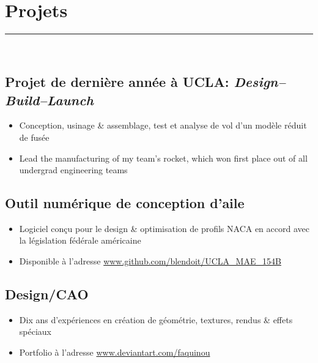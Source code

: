 \documentclass[10pt]{report}
\begin{document}
\section*{Projets}
\rule{\linewidth}{1pt}\\
\subsection*{Projet de dernière année à UCLA: \textit{Design--Build--Launch}}
\begin{itemize}
    \item Conception, usinage \& assemblage, test et analyse de vol d'un modèle réduit de fusée
    \item Lead the manufacturing of my team's rocket, which won first place out of all undergrad engineering teams
\end{itemize}
\subsection*{Outil numérique de conception d'aile}
\begin{itemize}
    \item Logiciel conçu pour le design \& optimisation de profils NACA en accord avec la législation fédérale américaine
    \item  Disponible à l'adresse \url{www.github.com/blendoit/UCLA_MAE_154B}
\end{itemize}
\subsection*{Design/CAO}
\begin{itemize}
    \item Dix ans d'expériences en création de géométrie, textures, rendus \& effets spéciaux
    \item Portfolio à l'adresse \url{www.deviantart.com/faquinou}
\end{itemize}
\end{document}
